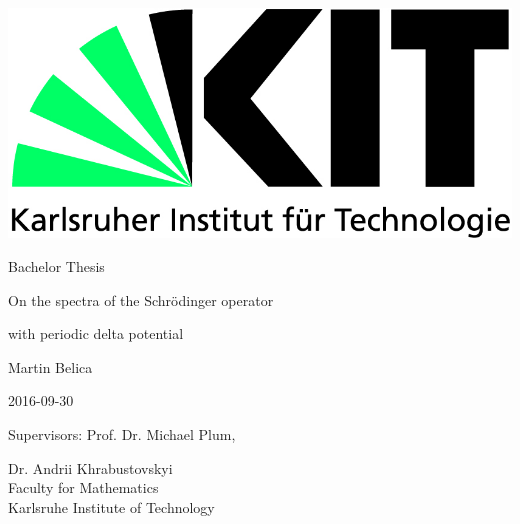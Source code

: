 \begin{titlepage}
  \includegraphics[scale=0.45]{kit-logo.jpg}
  \vspace*{1.5cm} 

  \begin{center} \large 
    
    Bachelor Thesis
    \vspace*{1.6cm}

    {\huge On the spectra of the Schrödinger operator}
     \vspace{-0.5cm}
     
    {\huge with periodic delta potential}
    \vspace*{2.5cm}

    Martin Belica
    \vspace{-0.5cm}

    2016-09-30
    \vspace*{3.5cm}


    Supervisors: Prof. Dr. Michael Plum,
    \vspace{-0.5cm}
    
    Dr. Andrii Khrabustovskyi \\[1cm]
    Faculty for Mathematics \\[1cm]
	Karlsruhe Institute of Technology
  \end{center}
\end{titlepage}